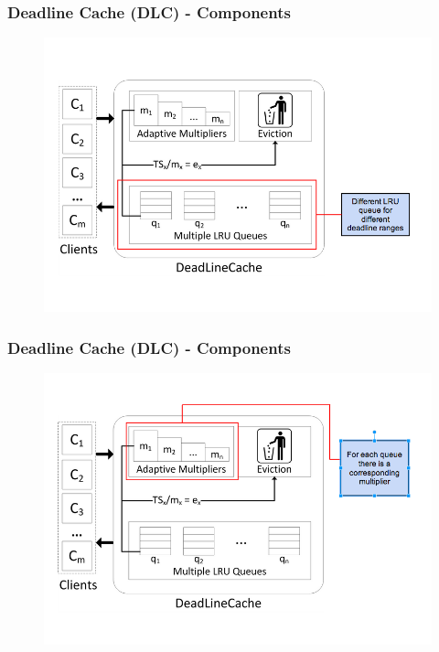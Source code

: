 \documentclass{beamer}
\begin{document}
\begin{frame}
  \frametitle{Deadline Cache (DLC) - Components}
  \begin{figure}
    \begin{center}
      \centerline{\includegraphics[scale=0.38]{img/DLC_ARC_1.png}}
    \end{center}
  \end{figure}
\end{frame}


\begin{frame}
  \frametitle{Deadline Cache (DLC) - Components}
  \begin{figure}
    \begin{center}
      \centerline{\includegraphics[scale=0.38]{img/DLC_ARC_2.png}}
    \end{center}
  \end{figure}
\end{frame}
\end{document}

